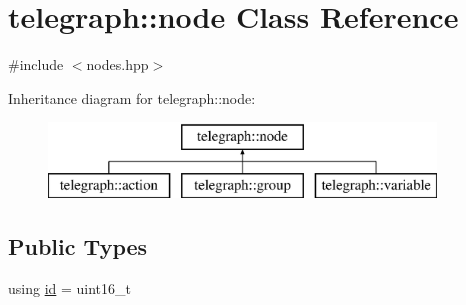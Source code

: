 \hypertarget{classtelegraph_1_1node}{}\section{telegraph\+:\+:node Class Reference}
\label{classtelegraph_1_1node}


{\ttfamily \#include $<$nodes.\+hpp$>$}

Inheritance diagram for telegraph\+:\+:node\+:\begin{figure}[H]
\begin{center}
\leavevmode
\includegraphics[height=2.000000cm]{classtelegraph_1_1node}
\end{center}
\end{figure}
\subsection*{Public Types}
\begin{DoxyCompactItemize}
\item 
using \hyperlink{classtelegraph_1_1node_a90bc576d668ed141d5354a06aa9c8d9a}{id} = uint16\+\_\+t
\end{DoxyCompactItemize}
